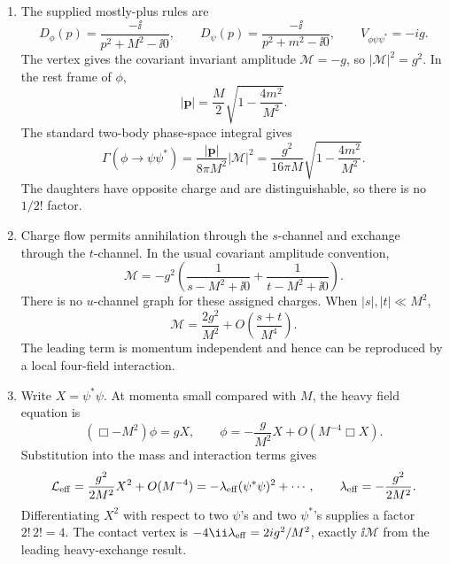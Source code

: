 \begin{enumerate}
\begin{enumerate}
\item
The supplied mostly-plus rules are
\[
 D_\phi(p)=\frac{-\ii}{p^2+M^2-\ii0},\qquad
 D_\psi(p)=\frac{-\ii}{p^2+m^2-\ii0},\qquad
 V_{\phi\psi\psi^*}=-ig.
\]
The vertex gives the covariant invariant amplitude
\(\mathcal M=-g\), so \(|\mathcal M|^2=g^2\).  In the rest frame of
\(\phi\),
\[
 |\mathbf p|=\frac M2\sqrt{1-\frac{4m^2}{M^2}}.
\]
The standard two-body phase-space integral gives
\[
 \Gamma(\phi\to\psi\psi^*)
 =\frac{|\mathbf p|}{8\pi M^2}|\mathcal M|^2
 =\frac{g^2}{16\pi M}
 \sqrt{1-\frac{4m^2}{M^2}}.
\]
The daughters have opposite charge and are distinguishable, so there is
no \(1/2!\) factor.
\item
Charge flow permits annihilation through the \(s\)-channel and exchange
through the \(t\)-channel.  In the usual covariant amplitude convention,
\[
 \mathcal M=-g^2\left(
 \frac1{s-M^2+\ii0}+\frac1{t-M^2+\ii0}\right).
\]
There is no \(u\)-channel graph for these assigned charges.  When
\(|s|,|t|\ll M^2\),
\[
 \mathcal M
 =\frac{2g^2}{M^2}
 +O\!\left(\frac{s+t}{M^4}\right).
\]
The leading term is momentum independent and hence can be reproduced by
a local four-field interaction.
\item
Write \(X=\psi^*\psi\).  At momenta small compared with \(M\), the heavy
field equation is
\[
 (\Box-M^2)\phi=gX,\qquad
 \phi=-\frac g{M^2}X+O(M^{-4}\Box X).
\]
Substitution into the mass and interaction terms gives
\[
 \mathcal L_{\rm eff}
 =\frac{g^2}{2M^2}X^2+O(M^{-4})
 =-\lambda_{\rm eff}(\psi^*\psi)^2+\cdots,
\qquad
 \lambda_{\rm eff}=-\frac{g^2}{2M^2}.
\]
Differentiating \(X^2\) with respect to two \(\psi\)'s and two
\(\psi^*\)'s supplies a factor \(2!\,2!=4\).  The contact vertex is
\(-4\ii\lambda_{\rm eff}=2ig^2/M^2\), exactly \(\ii\mathcal M\) from the
leading heavy-exchange result.
\end{enumerate}


\end{enumerate}
